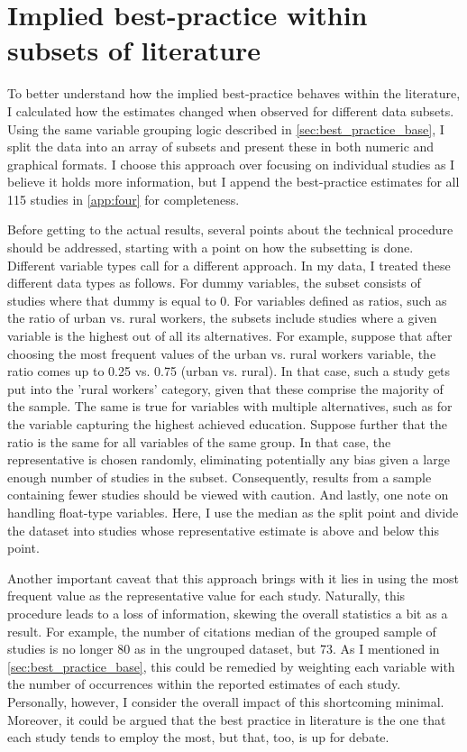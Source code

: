 \section{Implied best-practice within subsets of literature}
\label{sec:best_practice_subsets}

To better understand how the implied best-practice behaves within the literature, I calculated how the estimates changed when observed for different data subsets. Using the same variable grouping logic described in \autoref{sec:best_practice_base}, I split the data into an array of subsets and present these in both numeric and graphical formats. I choose this approach over focusing on individual studies as I believe it holds more information, but I append the best-practice estimates for all 115 studies in \autoref{app:four} for completeness.

Before getting to the actual results, several points about the technical procedure should be addressed, starting with a point on how the subsetting is done. Different variable types call for a different approach. In my data, I treated these different data types as follows. For dummy variables, the subset consists of studies where that dummy is equal to 0. For variables defined as ratios, such as the ratio of urban vs. rural workers, the subsets include studies where a given variable is the highest out of all its alternatives. For example, suppose that after choosing the most frequent values of the urban vs. rural workers variable, the ratio comes up to 0.25 vs. 0.75 (urban vs. rural). In that case, such a study gets put into the 'rural workers' category, given that these comprise the majority of the sample. The same is true for variables with multiple alternatives, such as for the variable capturing the highest achieved education. Suppose further that the ratio is the same for all variables of the same group. In that case, the representative is chosen randomly, eliminating potentially any bias given a large enough number of studies in the subset. Consequently, results from a sample containing fewer studies should be viewed with caution. And lastly, one note on handling float-type variables. Here, I use the median as the split point and divide the dataset into studies whose representative estimate is above and below this point.

Another important caveat that this approach brings with it lies in using the most frequent value as the representative value for each study. Naturally, this procedure leads to a loss of information, skewing the overall statistics a bit as a result. For example, the number of citations median of the grouped sample of studies is no longer 80 as in the ungrouped dataset, but 73. As I mentioned in \autoref{sec:best_practice_base}, this could be remedied by weighting each variable with the number of occurrences within the reported estimates of each study. Personally, however, I consider the overall impact of this shortcoming minimal. Moreover, it could be argued that the best practice in literature is the one that each study tends to employ the most, but that, too, is up for debate.

